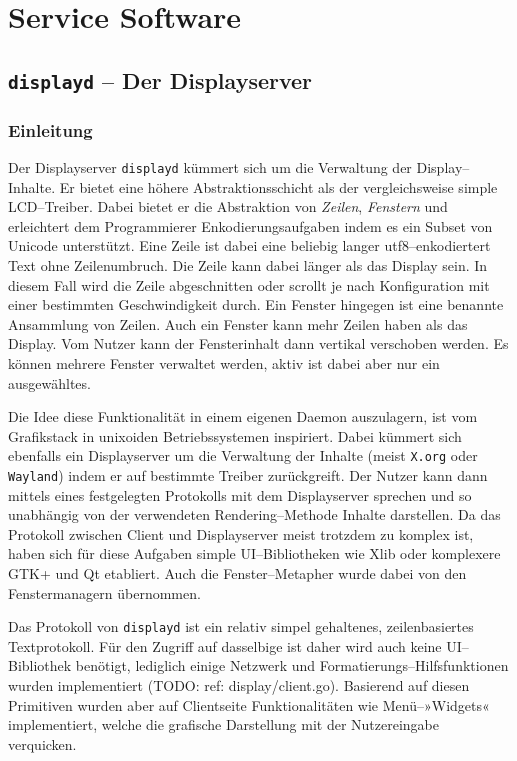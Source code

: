 \documentclass[11pt,ngerman,toc=listof,index=totoc]{scrreprt}
\begin{document}
\section{Service Software}\label{service-software}

\subsection{\texorpdfstring{\texttt{displayd} -- Der
Displayserver}{displayd -- Der Displayserver}}\label{displayd-der-displayserver}

\subsubsection{Einleitung}\label{einleitung}

Der Displayserver \texttt{displayd} kümmert sich um die Verwaltung der
Display--Inhalte. Er bietet eine höhere Abstraktionsschicht als der
vergleichsweise simple LCD--Treiber. Dabei bietet er die Abstraktion von
\emph{Zeilen}, \emph{Fenstern} und erleichtert dem Programmierer
Enkodierungsaufgaben indem es ein Subset von Unicode unterstützt. Eine
Zeile ist dabei eine beliebig langer utf8--enkodiertert Text ohne
Zeilenumbruch. Die Zeile kann dabei länger als das Display sein. In
diesem Fall wird die Zeile abgeschnitten oder scrollt je nach
Konfiguration mit einer bestimmten Geschwindigkeit durch. Ein Fenster
hingegen ist eine benannte Ansammlung von Zeilen. Auch ein Fenster kann
mehr Zeilen haben als das Display. Vom Nutzer kann der Fensterinhalt
dann vertikal verschoben werden. Es können mehrere Fenster verwaltet
werden, aktiv ist dabei aber nur ein ausgewähltes.

Die Idee diese Funktionalität in einem eigenen Daemon auszulagern, ist
vom Grafikstack in unixoiden Betriebssystemen inspiriert. Dabei kümmert
sich ebenfalls ein Displayserver um die Verwaltung der Inhalte (meist
\texttt{X.org} oder \texttt{Wayland}) indem er auf bestimmte Treiber
zurückgreift. Der Nutzer kann dann mittels eines festgelegten Protokolls
mit dem Displayserver sprechen und so unabhängig von der verwendeten
Rendering--Methode Inhalte darstellen. Da das Protokoll zwischen Client
und Displayserver meist trotzdem zu komplex ist, haben sich für diese
Aufgaben simple UI--Bibliotheken wie Xlib oder komplexere GTK+ und Qt
etabliert. Auch die Fenster--Metapher wurde dabei von den
Fenstermanagern übernommen.

Das Protokoll von \texttt{displayd} ist ein relativ simpel gehaltenes,
zeilenbasiertes Textprotokoll. Für den Zugriff auf dasselbige ist daher
wird auch keine UI--Bibliothek benötigt, lediglich einige Netzwerk und
Formatierungs--Hilfsfunktionen wurden implementiert (TODO: ref:
display/client.go). Basierend auf diesen Primitiven wurden aber auf
Clientseite Funktionalitäten wie Menü--»Widgets« implementiert, welche
die grafische Darstellung mit der Nutzereingabe verquicken.
\end{document}
